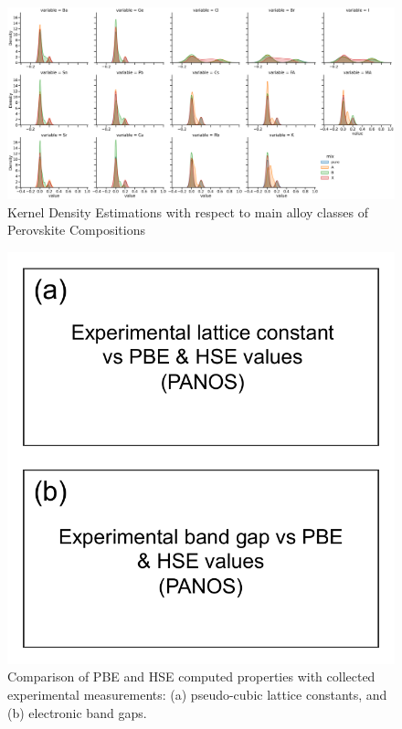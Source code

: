 \documentclass[twoside,twocolumn,9pt]{article}
\begin{document}
    \begin{figure}[h]
      \centering
      \includegraphics[width=0.80\linewidth]{./composition_kde.png}
      \caption{\label{fig:kdes}
        Kernel Density Estimations with respect to main alloy classes of
        Perovskite Compositions
      }
    \end{figure}


    \begin{figure}[h]
      \centering
      \includegraphics[width=0.80\linewidth]{Figure3.pdf}
      \caption{\label{Fig:outline} 
        Comparison of PBE and HSE computed properties with collected
        experimental measurements: (a) pseudo-cubic lattice constants, and
        (b) electronic band gaps.
      }
    \end{figure}
\end{document}

